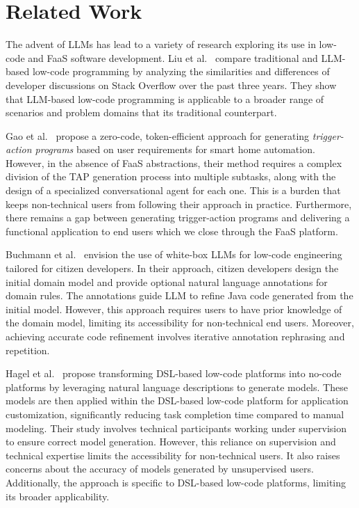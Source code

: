 \section{Related Work}
\label{sec:rw}

The advent of LLMs has lead to a variety of research exploring its use in low-code and FaaS software development.
Liu et al.~\cite{liu2024empirical} compare traditional and LLM-based low-code programming by analyzing the similarities and differences of developer discussions on Stack Overflow over the past three years.
They show that LLM-based low-code programming is applicable to a broader range of scenarios and problem domains that its traditional counterpart.

Gao et al.~\cite{gao2024chatiot} propose a zero-code, token-efficient approach for generating \emph{trigger-action programs} based on user requirements for smart home automation.
However, in the absence of FaaS abstractions, their method requires a complex division of the TAP generation process into multiple subtasks, along with the design of a specialized conversational agent for each one.
This is a burden that keeps non-technical users from following their approach in practice.
Furthermore, there remains a gap between generating trigger-action programs and delivering a functional application to end users which we close through the FaaS platform.

Buchmann et al.~\cite{buchmann2024white} envision the use of white-box LLMs for low-code engineering tailored for citizen developers.
In their approach, citizen developers design the initial domain model and provide optional natural language annotations for domain rules.
The annotations guide LLM to refine Java code generated from the initial model.
However, this approach requires users to have prior knowledge of the domain model, limiting its accessibility for non-technical end users.
Moreover, achieving accurate code refinement involves iterative annotation rephrasing and repetition.

Hagel et al.~\cite{hagel2024turning} propose transforming DSL-based low-code platforms into no-code platforms by leveraging natural language descriptions to generate models.
These models are then applied within the DSL-based low-code platform for application customization, significantly reducing task completion time compared to manual modeling.
Their study involves technical participants working under supervision to ensure correct model generation.
However, this reliance on supervision and technical expertise limits the accessibility for non-technical users.
It also raises concerns about the accuracy of models generated by unsupervised users.
Additionally, the approach is specific to DSL-based low-code platforms, limiting its broader applicability.

